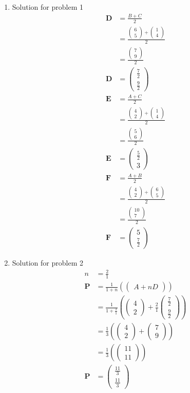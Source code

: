 \documentclass[12pt]{article}
\providecommand{\brak}[1]{\ensuremath{\left(#1\right)}}
\newcommand{\myvec}[1]{\ensuremath{\begin{pmatrix}#1\end{pmatrix}}}
\let\vec\mathbf
\begin{document}
\begin{enumerate}
\item Solution for problem 1
\begin{align}
\vec{D}&=\frac{B+C}{2}\\
&=\frac{\myvec{6\\5}+\myvec{1\\4}}{2}\\
&=\frac{\myvec{7\\9}}{2}\\
\vec{D}&=\myvec{\frac{7}{2}\\[2pt] \frac{9}{2}}\\
\vec{E}&=\frac{A+C}{2}\\
&=\frac{\myvec{4\\2}+\myvec{1\\4}}{2}\\
&=\frac{\myvec{5\\6}}{2}\\
\vec{E}&=\myvec{\frac{5}{2}\\ 3}\\
\vec{F}&=\frac{A+B}{2}\\
&=\frac{\myvec{4\\2}+\myvec{6\\5}}{2}\\
&=\frac{\myvec{10\\7}}{2}\\
\vec{F}&=\myvec{5\\ \frac{7}{2}}
\end{align}

\item Solution for problem 2
\begin{align}
n&=\frac{2}{1}\\
\vec{P}&=\frac{1}{1+n}\brak{\myvec{A+nD}}\\
&=\frac{1}{1+\frac{2}{1}}\brak{\myvec{4\\2}+\frac{2}{1}\myvec{\frac{7}{2}\\[2pt] \frac{9}{2}}}\\
&=\frac{1}{3}\brak{\myvec{4\\2}+\myvec{7\\9}}\\
&=\frac{1}{3}\brak{\myvec{11\\11}}\\
\vec{P}&=\myvec{\frac{11}{3}\\[2pt] \frac{11}{3}}
\end{align}


\end{enumerate}
\end{document}
